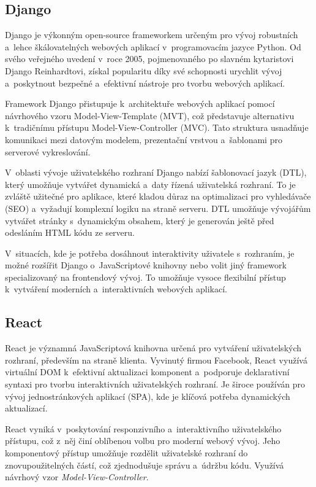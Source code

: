 \subsection{Django}
\label{subsec:dev-framework-django}
Django je výkonným open-source frameworkem určeným pro vývoj robustních a~lehce škálovatelných webových aplikací v~programovacím jazyce Python. Od svého veřejného uvedení v~roce 2005, pojmenovaného po slavném kytaristovi Django Reinhardtovi, získal popularitu díky své schopnosti urychlit vývoj a~poskytnout bezpečné a~efektivní nástroje pro tvorbu webových aplikací.

Framework Django přistupuje k~architektuře webových aplikací pomocí návrhového vzoru Model-View-Template (MVT), což představuje alternativu k~tradičnímu přístupu Model-View-Controller (MVC). Tato struktura usnadňuje komunikaci mezi datovým modelem, prezentační vrstvou a~šablonami pro serverové vykreslování.

V~oblasti vývoje uživatelského rozhraní Django nabízí šablonovací jazyk (DTL), který umožňuje vytvářet dynamická a~daty řízená uživatelská rozhraní. To je zvláště užitečné pro aplikace, které kladou důraz na optimalizaci pro vyhledávače (SEO) a~vyžadují komplexní logiku na straně serveru. DTL umožňuje vývojářům vytvářet stránky s~dynamickým obsahem, který je generován ještě před odesláním HTML kódu ze serveru.

V~situacích, kde je potřeba dosáhnout interaktivity uživatele s~rozhraním, je možné rozšířit Django o~JavaScriptové knihovny nebo volit jiný framework specializovaný na frontendový vývoj. To umožňuje vysoce flexibilní přístup k~vytváření moderních a~interaktivních webových aplikací. \cite{about_django}

\subsection{React}
\label{subsec:dev-framework-react}
React je významná JavaScriptová knihovna určená pro vytváření uživatelských rozhraní, především na straně klienta. Vyvinutý firmou Facebook, React využívá virtuální DOM k~efektivní aktualizaci komponent a~podporuje deklarativní syntaxi pro tvorbu interaktivních uživatelských rozhraní. Je široce používán pro vývoj jednostránkových aplikací (SPA), kde je klíčová potřeba dynamických aktualizací.

React vyniká v~poskytování responzivního a~interaktivního uživatelského přístupu, což z~něj činí oblíbenou volbu pro moderní webový vývoj. Jeho komponentový přístup umožňuje rozdělit uživatelské rozhraní do znovupoužitelných částí, což zjednodušuje správu a~údržbu kódu. Využívá návrhový vzor \textit{Model-View-Controller}. \cite{about_react}

